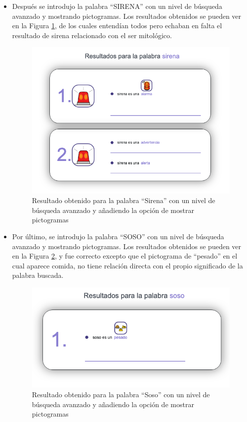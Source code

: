 \begin{itemize}
 
 	\item Después se introdujo la palabra ``SIRENA'' con un nivel de búsqueda avanzado y mostrando pictogramas. Los resultados obtenidos se pueden ver en la Figura \ref{fig:sirenaAvanzado}, de los cuales entendían todos pero echaban en falta el resultado de sirena relacionado con el ser mitológico.
 \begin{figure}[!h]
 	\includegraphics[width=.7\textwidth]{Imagenes/Bitmap/Capitulo4/EvaluacionFinal/6sirenaavanzado.png}
 	\centering
 	\caption{Resultado obtenido para la palabra ``Sirena'' con un nivel de búsqueda avanzado y añadiendo la opción de mostrar pictogramas}
 	\label{fig:sirenaAvanzado}
 \end{figure}
 
	\item Por último, se introdujo la palabra ``SOSO'' con un nivel de búsqueda avanzado y mostrando pictogramas. Los resultados obtenidos se pueden ver en la Figura \ref{fig:sosoAvanzado}, y fue correcto excepto que el pictograma de ``pesado'' en el cual aparece comida, no tiene relación directa con el propio significado de la palabra buscada.
\begin{figure}[!h]
	\includegraphics[width=.7\textwidth]{Imagenes/Bitmap/Capitulo4/EvaluacionFinal/7sosoavanzado.png}
	\centering
	\caption{Resultado obtenido para la palabra ``Soso'' con un nivel de búsqueda avanzado y añadiendo la opción de mostrar pictogramas}
	\label{fig:sosoAvanzado}
\end{figure}
	\end{itemize}



